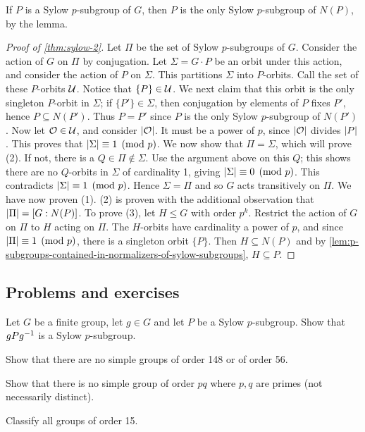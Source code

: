 \documentclass[./main.tex]{subfiles}
\begin{document}
If $P$ is a Sylow $p$-subgroup of $G$, then $P$ is the only Sylow
$p$-subgroup of $N(P)$, by the lemma. 


\begin{proof}[Proof of \cref{thm:sylow-2}]
    Let $\Pi$ be the set of Sylow $p$-subgroups of $G$. Consider the action of
    $G$ on $\Pi$ by conjugation. Let $\Sigma = G \cdot P$ be an orbit under this
    action, and consider the action of $P$ on $\Sigma$. This partitions $\Sigma$
    into $P$-orbits. Call the set of these $P$-orbits $\mathcal{U}$. Notice that
    $\{P\} \in \mathcal{U}$. We next claim that this orbit is the only singleton
    $P$-orbit in $\Sigma$; if $\{ P'\} \in \Sigma$, then conjugation by elements
    of $P$ fixes $P'$, hence $P \subseteq N(P')$. Thus $P = P'$ since $P$ is the
    only Sylow $p$-subgroup of $N(P')$. Now let $\mathcal{O} \in \mathcal{U}$, and consider
    $\abs {\mc O}$. It must be a power of $p$, since $\abs{\mc O}$ divides $\abs
    P$. This proves that $\abs{\Sigma} \equiv 1 \pmod p$. We now show that $\Pi
    = \Sigma$, which will prove (2). If not, there is a $Q \in \Pi \not\in
    \Sigma$. Use the argument above on this $Q$; this shows there are no
    $Q$-orbits in $\Sigma$ of cardinality 1, giving $\abs{\Sigma} \equiv 0 \pmod
    p$. This contradicts $\abs{\Sigma} \equiv 1 \pmod p$. Hence $\Sigma = \Pi$
    and so $G$ acts transitively on $\Pi$. We have now proven (1). (2) is proven
    with the additional observation that $\abs{\Pi} = [G:N(P)]$. To prove (3),
    let $H \leq G$ with order $p^k$. Restrict the action of $G$ on $\Pi$ to $H$
    acting on $\Pi$. The $H$-orbits have cardinality a power of $p$, and since
    $\abs{\Pi} \equiv 1 \pmod p$, there is a singleton orbit $\{P\}$. Then $H
    \subseteq N(P)$ and by
    \cref{lem:p-subgroups-contained-in-normalizers-of-sylow-subgroups}, $H
    \subseteq P$.
\end{proof}


\subsection{Problems and exercises}
\begin{exercise}
\label{ex:conjugate-of-sylow-subgroup}
    Let $G$ be a finite group, let $g \in G$ and let $P$ be a Sylow
    $p$-subgroup. Show that $gPg^{-1}$ is a Sylow $p$-subgroup.
\end{exercise}

\begin{exercise}
    Show that there are no simple groups of order 148 or of order 56.
\end{exercise}

\begin{exercise}
    Show that there is no simple group of order $pq$ where $p,q$ are primes (not
    necessarily distinct).
\end{exercise}

\begin{exercise}
    Classify all groups of order 15.
\end{exercise}
\end{document}

